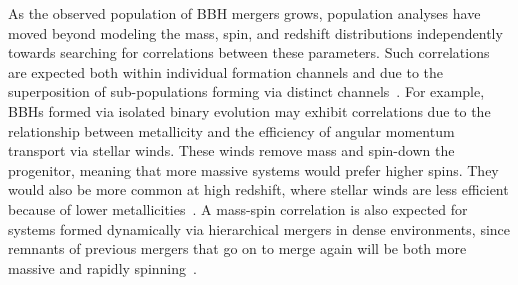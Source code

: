 \begin{refsection}
As the observed population of \ac{BBH} mergers grows, population analyses have moved beyond modeling the mass, spin, and redshift distributions independently towards searching for correlations between these parameters.
Such correlations are expected both within individual formation channels and due to the superposition of sub-populations forming via distinct channels~\cite{Bavera:2022mef, Bavera:2020inc, McKernan:2012rf, Stone:2016wzz, McKernan:2019beu, McKernan:2021nwk, Tagawa:2019osr, Mukherjee:2021rtw, Zevin:2022wrw, Karathanasis:2022rtr}. For example, \acp{BBH} formed via isolated binary evolution may exhibit correlations due to the relationship between metallicity and the efficiency of angular momentum transport via stellar winds. These winds remove mass and spin-down the progenitor, meaning that more massive systems would prefer higher spins. They would also be more common at high redshift, where stellar winds are less efficient because of lower metallicities~\cite{Belczynski:2017gds}.
A mass-spin correlation is also expected for systems formed dynamically via hierarchical mergers in dense environments, since remnants of previous mergers that go on to merge again will be both more massive and rapidly spinning~\cite[e.g.,][]{PortegiesZwart:2002iks, Rodriguez:2015oxa, Gerosa:2021mno}. 


\end{refsection}
